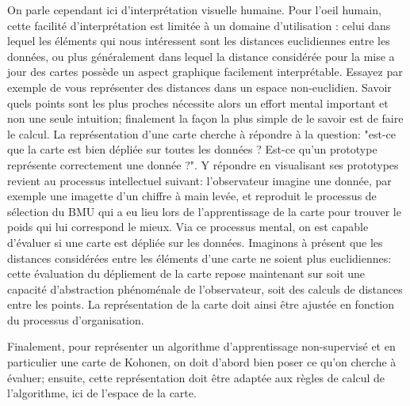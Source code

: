 On parle cependant ici d'interprétation visuelle humaine. Pour l'oeil humain, cette facilité d'interprétation est limitée à un domaine d'utilisation : celui dans lequel les éléments qui nous intéressent sont les distances euclidiennes entre les données, ou plus généralement dans lequel la distance considérée pour la mise a jour des cartes possède un aspect graphique facilement interprétable. Essayez par exemple de vous représenter des distances dans un espace non-euclidien. Savoir quels points sont les plus proches nécessite alors un effort mental important et non une seule intuition; finalement la façon la plus simple de le savoir est de faire le calcul. 
La représentation d'une carte cherche à répondre à la question: "est-ce que la carte est bien dépliée sur toutes les données ? Est-ce qu'un prototype représente correctement une donnée ?". Y répondre en visualisant ses prototypes revient au processus intellectuel suivant: l'observateur imagine une donnée, par exemple une imagette d'un chiffre à main levée, et reproduit le processus de sélection du BMU qui a eu lieu lors de l'apprentissage de la carte pour trouver le poids qui lui correspond le mieux. Via ce processus mental, on est capable d'évaluer si une carte est dépliée sur les données. 
Imaginons à présent que les distances considérées entre les éléments d'une carte ne soient plus euclidiennes: cette évaluation du dépliement de la carte repose maintenant sur soit une capacité d'abstraction phénoménale de l'observateur, soit des calculs de distances entre les points. La représentation de la carte doit ainsi être ajustée en fonction du processus d'organisation.

Finalement, pour représenter un algorithme d'apprentissage non-supervisé et en particulier une carte de Kohonen, on doit d'abord bien poser ce qu'on cherche à évaluer; ensuite, cette représentation doit être adaptée aux règles de calcul de l'algorithme, ici de l'espace de la carte. 





